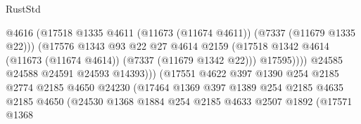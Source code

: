 \begin{lexlean}{RustStd}
\begin{coremodule}
                                              @4616
                                              (@17518
                                                @1335
                                                @4611
                                                (@11673 (@11674 @4611))
                                                (@7337 (@11679 @1335 @22)))
                                              (@17576
                                                @1343
                                                @93
                                                @22
                                                @27
                                                @4614
                                                @2159
                                                (@17518
                                                  @1342
                                                  @4614
                                                  (@11673 (@11674 @4614))
                                                  (@7337 (@11679 @1342 @22)))
                                                @17595))))
                                        @24585
                                        @24588
                                        @24591
                                        @24593
                                        @14393)))
                                  (@17551
                                    @4622
                                    @397
                                    @1390
                                    @254
                                    @2185
                                    @2774
                                    @2185
                                    @4650
                                    @24230
                                    (@17464
                                      @1369
                                      @397
                                      @1389
                                      @254
                                      @2185
                                      @4635
                                      @2185
                                      @4650
                                      (@24530
                                        @1368
                                        @1884
                                        @254
                                        @2185
                                        @4633
                                        @2507
                                        @1892
                                        (@17571
                                          @1368

\end{coremodule}
\end{lexlean}

